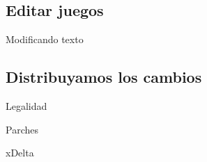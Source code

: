 \subsection{Editar juegos}
\begin{frame}{Modificando texto}
\end{frame}

\subsection{Distribuyamos los cambios}
\begin{frame}{Legalidad}
\end{frame}

\begin{frame}{Parches}
\end{frame}

\begin{frame}{xDelta}
\end{frame}

